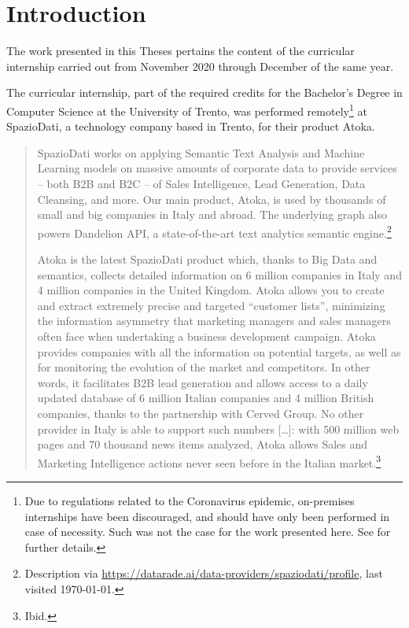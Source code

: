 \chapter{Introduction}
\label{ch:intro}

The work presented in this Theses pertains the content of the curricular internship carried out from November 2020 through December of the same year.

The curricular internship, part of the required credits for the Bachelor's Degree in Computer Science at the University of Trento, was performed remotely\footnote{%
Due to regulations related to the Coronavirus epidemic, on-premises internships have been discouraged, and should have only been performed in case of necessity. Such was not the case for the work presented here. See \cite{faq-covid} for further details.}
at SpazioDati, a technology company based in Trento, for their product Atoka.

\begin{quote}
SpazioDati works on applying Semantic Text Analysis and Machine Learning models on massive amounts of corporate data to provide services -- both B2B and B2C -- of Sales Intelligence, Lead Generation, Data Cleansing, and more.
Our main product, Atoka, is used by thousands of small and big companies in Italy and abroad. The underlying graph also powers Dandelion API, a state-of-the-art text analytics semantic engine.\footnote{%
Description via \url{https://datarade.ai/data-providers/spaziodati/profile}, last visited \today.
}

Atoka is the latest SpazioDati product which, thanks to Big Data and semantics, collects detailed information on 6 million companies in Italy and 4 million companies in the United Kingdom.
Atoka allows you to create and extract extremely precise and targeted ``customer lists'', minimizing the information asymmetry that marketing managers and sales managers often face when undertaking a business development campaign.
Atoka provides companies with all the information on potential targets, as well as for monitoring the evolution of the market and competitors.
In other words, it facilitates B2B lead generation and allows access to a daily updated database of 6 million Italian companies and 4 million British companies, thanks to the partnership with Cerved Group.
No other provider in Italy is able to support such numbers [\ldots]: with 500 million web pages and 70 thousand news items analyzed, Atoka allows Sales and Marketing Intelligence actions never seen before in the Italian market.\footnote{%
Ibid.
}
\end{quote}


